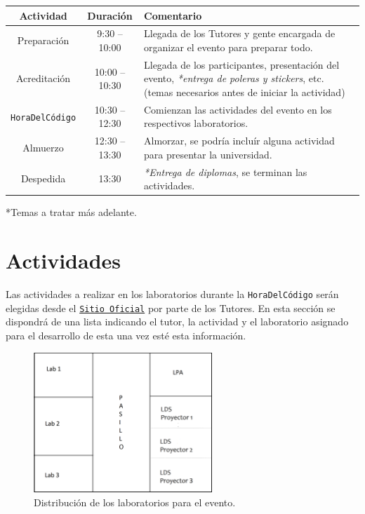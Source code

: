 \documentclass[letterpaper,12pt]{article}
\begin{document}
\begin{center}
\begin{tabular}{|c|c| p{11cm} |}
\hline
Actividad & Duración & Comentario \\
\hline \hline
Preparación & 9:30 -- 10:00 & Llegada de los Tutores y gente encargada de organizar el evento para preparar todo. \\ \hline
Acreditación & 10:00 -- 10:30 & Llegada de los participantes, presentación del evento, \emph{*entrega de poleras y stickers}, etc. (temas necesarios antes de iniciar la actividad) \\ \hline
\texttt{HoraDelCódigo} & 10:30 -- 12:30 & Comienzan las actividades del evento en los respectivos laboratorios. \\ \hline
Almuerzo & 12:30 -- 13:30 & Almorzar, se podría incluír alguna actividad para presentar la universidad. \\ \hline
Despedida & 13:30 & \emph{*Entrega de diplomas}, se terminan las actividades. \\ \hline
\end{tabular}
\end{center}

*Temas a tratar más adelante.

\section{Actividades}

Las actividades a realizar en los laboratorios durante la \texttt{HoraDelCódigo} serán elegidas desde el \texttt{\href{https://hourofcode.com/es/learn}{Sitio Oficial}} por parte de los Tutores. En esta sección se dispondrá de una lista indicando el tutor, la actividad y el laboratorio asignado para el desarrollo de esta una vez esté esta información.

\begin{figure}[H]
  \centering
    \includegraphics[width=0.6\textwidth]{salas}
  \caption{Distribución de los laboratorios para el evento.}
\end{figure}
\end{document}
